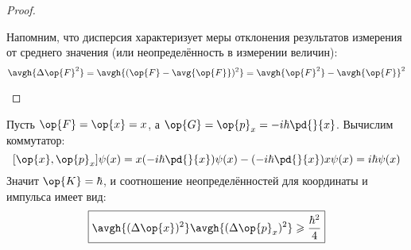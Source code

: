 \begin{proof}
\begin{enumerate}
Напомним, что дисперсия характеризует меры отклонения результатов измерения от среднего значения (или неопределённость в измерении величин):
$$
  \avgh{\Delta\op{F}^2} = \avgh{(\op{F}-\avg{\op{F}})^2} =
    \avgh{\op{F}^2}-\avgh{\op{F}}^2
$$
\end{enumerate}
\end{proof}

\begin{exmpl*} Пусть $\op{F}=\op{x}=x$, а $\op{G}=\op{p}_x=-i\hbar\pd{}{x}$. Вычислим коммутатор:
$$
  [\op{x}, \op{p}_x] \psi(x) =
    x (-i\hbar\pd{}{x})\psi(x) - (-i\hbar\pd{}{x}) x \psi(x) =
    i\hbar\psi(x)
$$%
%
Значит $\op{K}=\hbar$, и соотношение неопределённостей для координаты и импульса имеет вид:
$$
  \boxed{\avgh{(\Delta\op{x})^2}\avgh{(\Delta\op{p}_x)^2} \geqslant \frac{\hbar^2}{4}}
$$
\end{exmpl*}